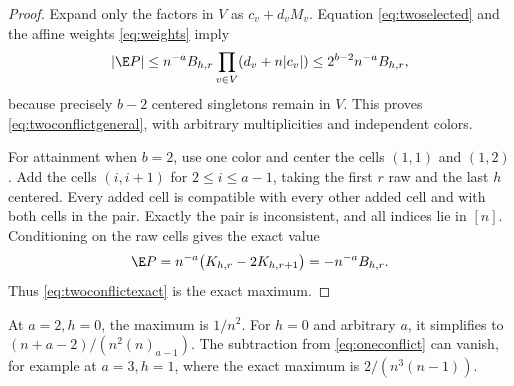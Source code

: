 \begin{proof}
Expand only the factors in $V$ as $c_v+d_vM_v$. Equation \eqref{eq:twoselected} and the affine weights \eqref{eq:weights} imply
\[
|\E P|\le n^{-a}B_{h,r}
\prod_{v\in V}(d_v+n|c_v|)
\le2^{b-2}n^{-a}B_{h,r},
\]
because precisely $b-2$ centered singletons remain in $V$. This proves \eqref{eq:twoconflictgeneral}, with arbitrary multiplicities and independent colors.

For attainment when $b=2$, use one color and center the cells $(1,1)$ and $(1,2)$. Add the cells $(i,i+1)$ for $2\le i\le a-1$, taking the first $r$ raw and the last $h$ centered. Every added cell is compatible with every other added cell and with both cells in the pair. Exactly the pair is inconsistent, and all indices lie in $[n]$. Conditioning on the raw cells gives the exact value
\[
\E P=n^{-a}\bigl(K_{h,r}-2K_{h,r+1}\bigr)
=-n^{-a}B_{h,r}.
\]
Thus \eqref{eq:twoconflictexact} is the exact maximum.
\end{proof}

At $a=2,h=0$, the maximum is $1/n^2$. For $h=0$ and arbitrary $a$, it simplifies to $(n+a-2)/(n^2(n)_{a-1})$. The subtraction from \eqref{eq:oneconflict} can vanish, for example at $a=3,h=1$, where the exact maximum is $2/(n^3(n-1))$.
